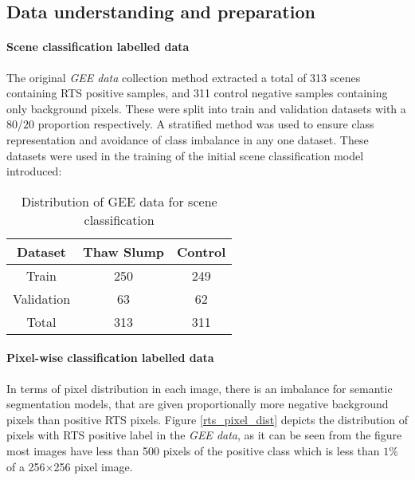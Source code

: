 \paragraph{}


\subsection{Data understanding and preparation} \label{dataprep}

\paragraph{Scene classification labelled data}
The original \textit{\gls{GEE} data} collection method extracted a total of 313 scenes containing \gls{RTS} positive samples, and 311 control negative samples containing only background pixels. These were split into train and validation datasets with a $80$/$20$ proportion respectively. A stratified method was used to ensure class representation and avoidance of class imbalance in any one dataset. These datasets were used in the training of the initial scene classification model introduced:
\begin{table}[ht!] 
    \begin{center}
    \begin{tabular}{c|c|c}    
    \textbf{Dataset} & \textbf{Thaw Slump} & \textbf{Control} \\
    \hline
    Train 
    &  250
    & 249  \\
    \hline
    Validation 
    &  63
    & 62  \\
    \hline
    Total 
    &  313
    & 311  \\
    \hline
    \end{tabular}
    \end{center}
    \caption{Distribution of \gls{GEE} data for scene classification}\label{table_label_data_class}
\end{table}
\paragraph{Pixel-wise classification labelled data}
In terms of pixel distribution in each image, there is an imbalance for semantic segmentation models, that are given proportionally more negative background pixels than positive \gls{RTS} pixels. 
Figure \ref{rts_pixel_dist} depicts the distribution of pixels with \gls{RTS} positive label in the \textit{\gls{GEE} data}, as it can be seen from the figure most images have less than 500 pixels of the positive class which is less than $1\%$ of a 256×256 pixel image.

